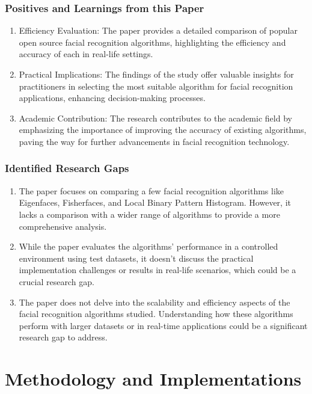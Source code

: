 \documentclass[openany]{report}
\begin{document}
\subsection{Positives and Learnings from this Paper}

\begin{enumerate}
    \item Efficiency Evaluation: The paper provides a detailed comparison of popular open source facial recognition algorithms, highlighting the efficiency and accuracy of each in real-life settings.

    \item Practical Implications: The findings of the study offer valuable insights for practitioners in selecting the most suitable algorithm for facial recognition applications, enhancing decision-making processes.

    \item Academic Contribution: The research contributes to the academic field by emphasizing the importance of improving the accuracy of existing algorithms, paving the way for further advancements in facial recognition technology.
\end{enumerate}

\subsection{Identified Research Gaps}
\begin{enumerate}
    \item The paper focuses on comparing a few facial recognition algorithms like Eigenfaces, Fisherfaces, and Local Binary Pattern Histogram. However, it lacks a comparison with a wider range of algorithms to provide a more comprehensive analysis.

    \item While the paper evaluates the algorithms' performance in a controlled environment using test datasets, it doesn't discuss the practical implementation challenges or results in real-life scenarios, which could be a crucial research gap.

    \item The paper does not delve into the scalability and efficiency aspects of the facial recognition algorithms studied. Understanding how these algorithms perform with larger datasets or in real-time applications could be a significant research gap to address.
\end{enumerate}

\chapter{Methodology and Implementations}
\end{document}
